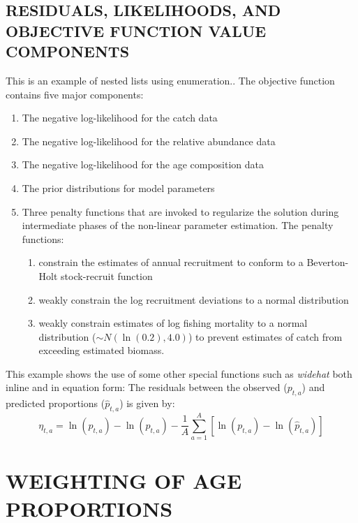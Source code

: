 \documentclass[11pt]{book}\usepackage[]{graphicx}\usepackage[]{color}
\begin{document}
\section{RESIDUALS, LIKELIHOODS, AND OBJECTIVE FUNCTION VALUE COMPONENTS}
This is an example of nested lists using enumeration.. The objective function contains five major components:
\begin{enumerate}
  \item The negative log-likelihood for the catch data
  \item The negative log-likelihood for the relative abundance data
  \item The negative log-likelihood for the age composition data
  \item The prior distributions for model parameters
  \item Three penalty functions that are invoked to regularize the solution during intermediate phases of the non-linear parameter estimation. The penalty functions:
  \begin{enumerate}
    \item constrain the estimates of annual recruitment to conform to a Beverton-Holt stock-recruit function
    \item weakly constrain the log recruitment deviations to a normal distribution
    \item weakly constrain estimates of log fishing mortality to a normal distribution ($\sim N(\ln(0.2), 4.0)$) to prevent estimates of catch from exceeding estimated biomass.
    \end{enumerate}
\end{enumerate}


This example shows the use of some other special functions such as \emph{widehat} both inline and in equation form:
The residuals between the observed ($p_{t,a}$) and predicted proportions ($\widehat{p}_{t,a}$) is given by:
\begin{equation}\label{eq:widehat}
\eta_{t,a}=\ln(p_{t,a})-\ln(\widehat{p}_{t,a})-\frac{1}{A}\sum_{a=1}^A\left[\ln(p_{t,a})-\ln(\widehat{p}_{t,a}) \right]
\end{equation}
\clearpage

\newpage


\clearpage

\chapter{WEIGHTING OF AGE PROPORTIONS}
\label{chap:agecompweight}
\end{document}
